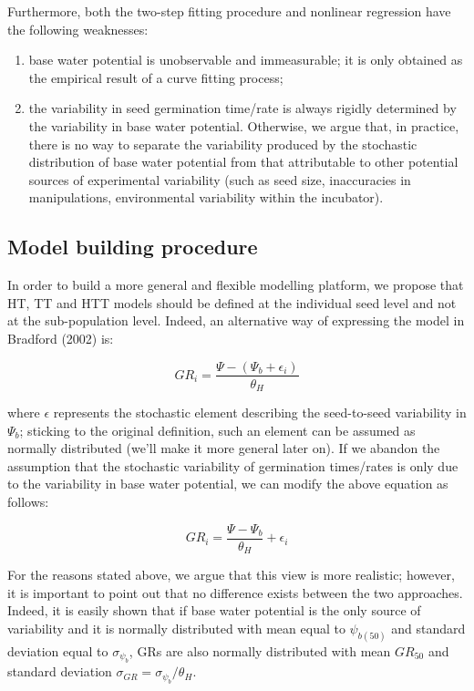\documentclass[a4paper,12pt]{article}
\providecommand{\tightlist}{%
	\setlength{\itemsep}{0pt}\setlength{\parskip}{0pt}}
\begin{document}
Furthermore, both the two-step fitting procedure and nonlinear
regression have the following weaknesses:

\begin{enumerate}
\def\labelenumi{\arabic{enumi}.}
\tightlist
\item
  base water potential is unobservable and immeasurable; it is only
  obtained as the empirical result of a curve fitting process;
\item
  the variability in seed germination time/rate is always rigidly
  determined by the variability in base water potential. Otherwise, we
  argue that, in practice, there is no way to separate the variability
  produced by the stochastic distribution of base water potential from
  that attributable to other potential sources of experimental
  variability (such as seed size, inaccuracies in manipulations,
  environmental variability within the incubator).
\end{enumerate}

\subsection{Model building procedure}\label{model-building-procedure}

In order to build a more general and flexible modelling platform, we
propose that HT, TT and HTT models should be defined at the individual
seed level and not at the sub-population level. Indeed, an alternative
way of expressing the model in Bradford (2002) is:

\begin{equation}
 GR_i = \frac{\Psi - (\Psi_b + \epsilon_i)}{\theta_H}
\end{equation}

where \(\epsilon\) represents the stochastic element describing the
seed-to-seed variability in \(\Psi_b\); sticking to the original
definition, such an element can be assumed as normally distributed
(we'll make it more general later on). If we abandon the assumption that
the stochastic variability of germination times/rates is only due to the
variability in base water potential, we can modify the above equation as
follows:

\begin{equation}
GR_i = \frac{\Psi - \Psi_b}{\theta_H} + \epsilon_i
\end{equation}

For the reasons stated above, we argue that this view is more realistic;
however, it is important to point out that no difference exists between
the two approaches. Indeed, it is easily shown that if base water
potential is the only source of variability and it is normally
distributed with mean equal to \(\psi_{b(50)}\) and standard deviation
equal to \(\sigma_{\psi_b}\), GRs are also normally distributed with
mean \(GR_{50}\) and standard deviation
\(\sigma_{GR} = \sigma_{\psi_b} / \theta_H\).
\end{document}
